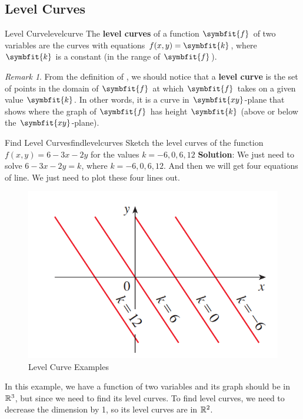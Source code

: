 \documentclass[math,code]{amznotes}
\theoremstyle{remark}
\newtheorem*{remark}{Remark}
\begin{document}
\subsection{Level Curves}
\begin{dfnbox}{Level Curve}{levelcurve}
    The {\color{red} \textbf{level curves}} of a function $\symbfit{f}$ of two variables are the curves with equations $f(x,y)=\symbfit{k}$, where $\symbfit{k}$ is a constant (in the range of $\symbfit{f}$).
\end{dfnbox}
\begin{notebox}
    \begin{remark}
        From the definition of , we should notice that a {\color{red} \textbf{level curve}} is the set of points in the domain of $\symbfit{f}$ at which $\symbfit{f}$ takes on a given value $\symbfit{k}$. In other words, it is a curve in {\color{red} $\symbfit{xy}$-plane} that shows where the graph of $\symbfit{f}$ has height $\symbfit{k}$ (above or below the $\symbfit{xy}$-plane).
    \end{remark}
\end{notebox}
\begin{exbox}{Find Level Curves}{findlevelcurves}
    Sketch the level curves of the function $f(x,y)=6-3x-2y$ for the values $k=-6,0,6,12$ \newline
    {\color{blue} \textbf{Solution}}: We just need to solve $6-3x-2y=k$, where $k=-6,0,6,12$. And then we will get four equations of line. We just need to plot these four lines out.
    \begin{figure}[H]
        \centering
        \includegraphics[width=0.5\linewidth]{images/level-curve-example.png}
        \caption{Level Curve Examples}
        \label{fig:level-curve-examples}
    \end{figure}
    In this example, we have a function of two variables and its graph should be in $\mathbb{R}^3$, but since we need to find its level curves. To find level curves, we need to decrease the dimension by 1, so its level curves are in $\mathbb{R}^2$.
\end{exbox}
\end{document}

